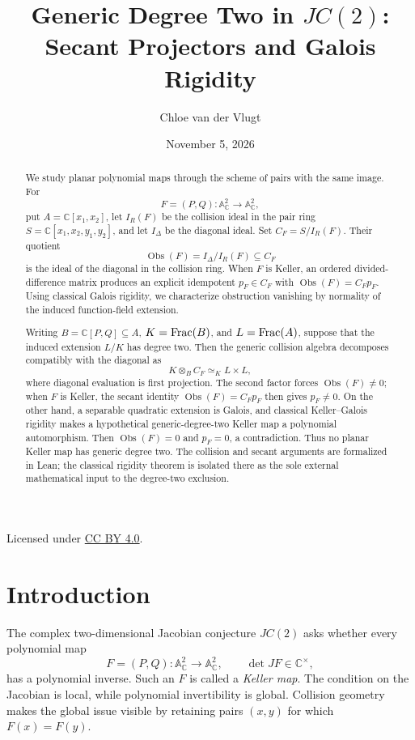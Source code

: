 \documentclass[11pt]{article}
\title{\texorpdfstring
  {Generic Degree Two in \(JC(2)\):\\
   Secant Projectors and Galois Rigidity}
  {Generic Degree Two in JC(2): Secant Projectors and Galois Rigidity}}
\author{Chloe van der Vlugt}\date{November 5, 2026}
\newcommand{\A}{\mathbb A}
\newcommand{\C}{\mathbb C}
\newcommand{\Obs}{\operatorname{Obs}}
\begin{document}
\maketitle

\begin{abstract}
We study planar polynomial maps through the scheme of pairs with the same
image.  For
\[
  F=(P,Q)\colon\A^2_{\C}\longrightarrow\A^2_{\C},
\]
put \(A=\C[x_1,x_2]\), let \(I_R(F)\) be the collision ideal in the
pair ring \(S=\C[x_1,x_2,y_1,y_2]\), and let \(I_\Delta\) be the diagonal
ideal.  Set \(C_F=S/I_R(F)\).  Their quotient
\[
  \Obs(F)=I_\Delta/I_R(F)\subseteq C_F
\]
is the ideal of the diagonal in the collision ring.  When \(F\) is Keller,
an ordered divided-difference matrix produces an explicit idempotent
\(p_F\in C_F\) with \(\Obs(F)=C_Fp_F\).  Using classical Galois
rigidity, we characterize obstruction vanishing by normality of the induced
function-field extension.

Writing \(B=\C[P,Q]\subseteq A\), \(K=\operatorname{Frac}(B)\), and
\(L=\operatorname{Frac}(A)\), suppose that the induced extension \(L/K\) has degree
two.  Then the generic collision algebra decomposes compatibly with the
diagonal as
\[
  K\otimes_BC_F\simeq_K L\times L,
\]
where diagonal evaluation is first projection.  The second factor forces
\(\Obs(F)\neq0\); when \(F\) is Keller, the secant identity
\(\Obs(F)=C_Fp_F\) then gives \(p_F\neq0\).  On the other hand, a separable
quadratic extension is Galois, and classical Keller--Galois rigidity makes
a hypothetical generic-degree-two Keller map a polynomial automorphism.  Then
\(\Obs(F)=0\) and \(p_F=0\), a contradiction.  Thus no planar Keller map
has generic degree two.  The collision and secant arguments are formalized
in Lean; the classical rigidity theorem is isolated there as the sole
external mathematical input to the degree-two exclusion.
\end{abstract}

\begin{center}
  \small Licensed under
  \href{https://creativecommons.org/licenses/by/4.0/}
    {CC BY 4.0}.
\end{center}

\clearpage
\tableofcontents

\section{Introduction}
\label{sec:introduction}

The complex two-dimensional Jacobian conjecture \(JC(2)\) asks whether every
polynomial map
\[
  F=(P,Q)\colon\A^2_{\C}\longrightarrow\A^2_{\C},
  \qquad \det JF\in\C^\times,
\]
has a polynomial inverse.  Such an \(F\) is called a \emph{Keller map}.
The condition on the Jacobian is local, while polynomial invertibility is
global.  Collision geometry makes the global issue visible by retaining
pairs \((x,y)\) for which \(F(x)=F(y)\).
\end{document}
